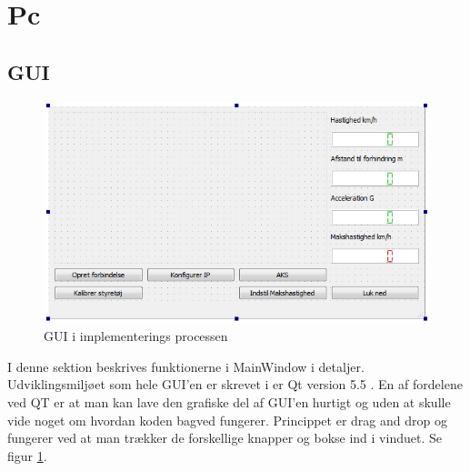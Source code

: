 \section{Pc}
\subsection{GUI}
\begin{figure}[H]
\centering
\includegraphics[width=\textwidth* 3/4,height=\textwidth* 9/20 ]{../fig/billeder/gui_design.png}
\caption{GUI i implementerings processen}
\label{fig:GUI_design}
\end{figure}
I denne sektion beskrives funktionerne i MainWindow i detaljer. Udviklingsmiljøet som hele GUI'en er skrevet i er Qt version 5.5 \cite{lib:qt}. En af fordelene ved QT er at man kan lave den grafiske del af GUI'en hurtigt og uden at skulle vide noget om hvordan koden bagved fungerer. Princippet er drag and drop og fungerer ved at man trækker de forskellige knapper og bokse ind i vinduet. Se figur \ref{fig:GUI_design}.
